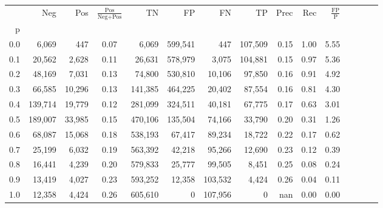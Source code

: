\begin{tabular}{rrrcrrrrrrrrrrr}
\toprule
{} &      Neg &     Pos & $\frac{\text{Pos}}{\text{Neg}+\text{Pos}}$ &       TN &       FP &       FN &       TP &  Prec &   Rec & $\frac{\text{FP}}{\text{P}}$ \\
p   &          &         &                                            &          &          &          &          &       &       &                              \\
\midrule
0.0 &    6,069 &     447 &                                       0.07 &    6,069 &  599,541 &      447 &  107,509 &  0.15 &  1.00 &                         5.55 \\
0.1 &   20,562 &   2,628 &                                       0.11 &   26,631 &  578,979 &    3,075 &  104,881 &  0.15 &  0.97 &                         5.36 \\
0.2 &   48,169 &   7,031 &                                       0.13 &   74,800 &  530,810 &   10,106 &   97,850 &  0.16 &  0.91 &                         4.92 \\
0.3 &   66,585 &  10,296 &                                       0.13 &  141,385 &  464,225 &   20,402 &   87,554 &  0.16 &  0.81 &                         4.30 \\
0.4 &  139,714 &  19,779 &                                       0.12 &  281,099 &  324,511 &   40,181 &   67,775 &  0.17 &  0.63 &                         3.01 \\
0.5 &  189,007 &  33,985 &                                       0.15 &  470,106 &  135,504 &   74,166 &   33,790 &  0.20 &  0.31 &                         1.26 \\
0.6 &   68,087 &  15,068 &                                       0.18 &  538,193 &   67,417 &   89,234 &   18,722 &  0.22 &  0.17 &                         0.62 \\
0.7 &   25,199 &   6,032 &                                       0.19 &  563,392 &   42,218 &   95,266 &   12,690 &  0.23 &  0.12 &                         0.39 \\
0.8 &   16,441 &   4,239 &                                       0.20 &  579,833 &   25,777 &   99,505 &    8,451 &  0.25 &  0.08 &                         0.24 \\
0.9 &   13,419 &   4,027 &                                       0.23 &  593,252 &   12,358 &  103,532 &    4,424 &  0.26 &  0.04 &                         0.11 \\
1.0 &   12,358 &   4,424 &                                       0.26 &  605,610 &        0 &  107,956 &        0 &   nan &  0.00 &                         0.00 \\
\bottomrule
\end{tabular}
